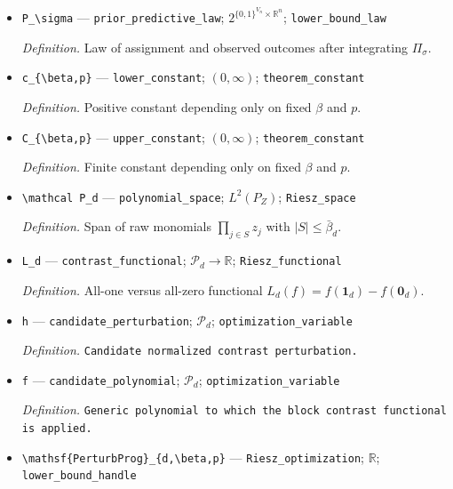 \documentclass{article}
\begin{document}
\begin{itemize}
  \item \texttt{P\_\allowbreak{}\textbackslash{}\allowbreak{}sigma} --- \texttt{prior\_\allowbreak{}predictive\_\allowbreak{}law}; \(2^{\{0,1\}^{V_n}\times\mathbb R^n}\); \texttt{lower\_\allowbreak{}bound\_\allowbreak{}law}
  \par\smallskip\noindent\emph{Definition.} Law of assignment and observed outcomes after integrating \(\Pi_\sigma\).
  \item \texttt{c\_\allowbreak{}\{\textbackslash{}\allowbreak{}beta,\allowbreak{}p\}\allowbreak{}} --- \texttt{lower\_\allowbreak{}constant}; \((0,\infty)\); \texttt{theorem\_\allowbreak{}constant}
  \par\smallskip\noindent\emph{Definition.} Positive constant depending only on fixed \(\beta\) and \(p\).
  \item \texttt{C\_\allowbreak{}\{\textbackslash{}\allowbreak{}beta,\allowbreak{}p\}\allowbreak{}} --- \texttt{upper\_\allowbreak{}constant}; \((0,\infty)\); \texttt{theorem\_\allowbreak{}constant}
  \par\smallskip\noindent\emph{Definition.} Finite constant depending only on fixed \(\beta\) and \(p\).
  \item \texttt{\textbackslash{}\allowbreak{}mathcal P\_\allowbreak{}d} --- \texttt{polynomial\_\allowbreak{}space}; \(L^2(P_Z)\); \texttt{Riesz\_\allowbreak{}space}
  \par\smallskip\noindent\emph{Definition.} Span of raw monomials \(\prod_{j\in S}z_j\) with \(|S|\le\bar\beta_d\).
  \item \texttt{L\_\allowbreak{}d} --- \texttt{contrast\_\allowbreak{}functional}; \(\mathcal P_d\to\mathbb R\); \texttt{Riesz\_\allowbreak{}functional}
  \par\smallskip\noindent\emph{Definition.} All-one versus all-zero functional \(L_d(f)=f(\mathbf1_d)-f(\mathbf0_d)\).
  \item \texttt{h} --- \texttt{candidate\_\allowbreak{}perturbation}; \(\mathcal P_d\); \texttt{optimization\_\allowbreak{}variable}
  \par\smallskip\noindent\emph{Definition.} \texttt{Candidate normalized contrast perturbation.}
  \item \texttt{f} --- \texttt{candidate\_\allowbreak{}polynomial}; \(\mathcal P_d\); \texttt{optimization\_\allowbreak{}variable}
  \par\smallskip\noindent\emph{Definition.} \texttt{Generic polynomial to which the block contrast functional is applied.}
  \item \texttt{\textbackslash{}\allowbreak{}mathsf\{PerturbProg\}\allowbreak{}\_\allowbreak{}\{d,\allowbreak{}\textbackslash{}\allowbreak{}beta,\allowbreak{}p\}\allowbreak{}} --- \texttt{Riesz\_\allowbreak{}optimization}; \(\mathbb R\); \texttt{lower\_\allowbreak{}bound\_\allowbreak{}handle}

\end{itemize}
\end{document}
